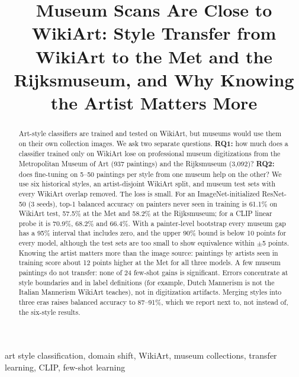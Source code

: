 \documentclass[conference]{IEEEtran}
\begin{document}
\title{Museum Scans Are Close to WikiArt: Style Transfer from WikiArt to the Met and the Rijksmuseum, and Why Knowing the Artist Matters More}

\author{
}

\maketitle

\begin{abstract}
Art-style classifiers are trained and tested on WikiArt, but museums would use them on their own collection images. We ask two separate questions. \textbf{RQ1:} how much does a classifier trained only on WikiArt lose on professional museum digitizations from the Metropolitan Museum of Art (937 paintings) and the Rijksmuseum (3,092)? \textbf{RQ2:} does fine-tuning on 5--50 paintings per style from one museum help on the other? We use six historical styles, an artist-disjoint WikiArt split, and museum test sets with every WikiArt overlap removed. The loss is small. For an ImageNet-initialized ResNet-50 (3 seeds), top-1 balanced accuracy on painters never seen in training is 61.1\% on WikiArt test, 57.5\% at the Met and 58.2\% at the Rijksmuseum; for a CLIP linear probe it is 70.9\%, 68.2\% and 66.4\%. With a painter-level bootstrap every museum gap has a 95\% interval that includes zero, and the upper 90\% bound is below 10 points for every model, although the test sets are too small to show equivalence within $\pm$5 points. Knowing the artist matters more than the image source: paintings by artists seen in training score about 12 points higher at the Met for all three models. A few museum paintings do not transfer: none of 24 few-shot gains is significant. Errors concentrate at style boundaries and in label definitions (for example, Dutch Mannerism is not the Italian Mannerism WikiArt teaches), not in digitization artifacts. Merging styles into three eras raises balanced accuracy to 87--91\%, which we report next to, not instead of, the six-style results.
\end{abstract}

\begin{IEEEkeywords}
art style classification, domain shift, WikiArt, museum collections, transfer learning, CLIP, few-shot learning
\end{IEEEkeywords}
\end{document}

